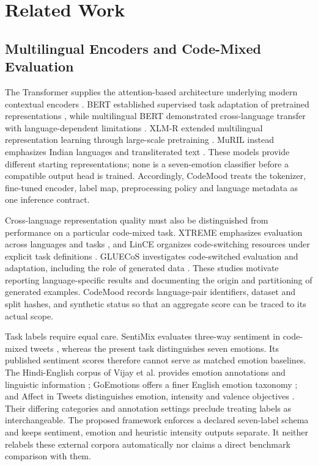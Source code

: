 \documentclass[journal]{IEEEtran}
\begin{document}
\section{Related Work}

\subsection{Multilingual Encoders and Code-Mixed Evaluation}

The Transformer supplies the attention-based architecture underlying modern contextual encoders \cite{vaswani2017}. BERT established supervised task adaptation of pretrained representations \cite{devlin2019}, while multilingual BERT demonstrated cross-language transfer with language-dependent limitations \cite{pires2019}. XLM-R extended multilingual representation learning through large-scale pretraining \cite{conneau2020}. MuRIL instead emphasizes Indian languages and transliterated text \cite{khanuja2021}. These models provide different starting representations; none is a seven-emotion classifier before a compatible output head is trained. Accordingly, CodeMood treats the tokenizer, fine-tuned encoder, label map, preprocessing policy and language metadata as one inference contract.

Cross-language representation quality must also be distinguished from performance on a particular code-mixed task. XTREME emphasizes evaluation across languages and tasks \cite{hu2020}, and LinCE organizes code-switching resources under explicit task definitions \cite{aguilar2020}. GLUECoS investigates code-switched evaluation and adaptation, including the role of generated data \cite{khanuja2020}. These studies motivate reporting language-specific results and documenting the origin and partitioning of generated examples. CodeMood records language-pair identifiers, dataset and split hashes, and synthetic status so that an aggregate score can be traced to its actual scope.

Task labels require equal care. SentiMix evaluates three-way sentiment in code-mixed tweets \cite{patwa2020}, whereas the present task distinguishes seven emotions. Its published sentiment scores therefore cannot serve as matched emotion baselines. The Hindi-English corpus of Vijay et al. provides emotion annotations and linguistic information \cite{vijay2018}; GoEmotions offers a finer English emotion taxonomy \cite{demszky2020}; and Affect in Tweets distinguishes emotion, intensity and valence objectives \cite{mohammad2018}. Their differing categories and annotation settings preclude treating labels as interchangeable. The proposed framework enforces a declared seven-label schema and keeps sentiment, emotion and heuristic intensity outputs separate. It neither relabels these external corpora automatically nor claims a direct benchmark comparison with them.
\end{document}
